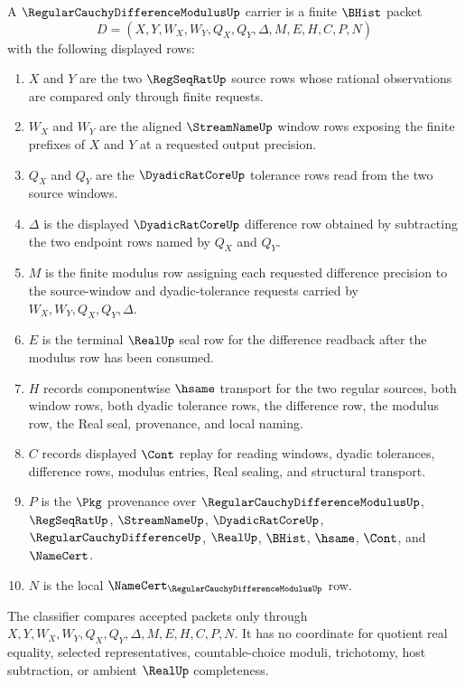 \begin{definition}
\label{def:regular-cauchy-difference-modulus-carrier}
A $\RegularCauchyDifferenceModulusUp$ carrier is a finite $\BHist$ packet
$$
D=(X,Y,W_X,W_Y,Q_X,Q_Y,\Delta,M,E,H,C,P,N)
$$
with the following displayed rows:
\begin{enumerate}
\item $X$ and $Y$ are the two $\RegSeqRatUp$ source rows whose rational observations are compared only through finite requests.
\item $W_X$ and $W_Y$ are the aligned $\StreamNameUp$ window rows exposing the finite prefixes of $X$ and $Y$ at a requested output precision.
\item $Q_X$ and $Q_Y$ are the $\DyadicRatCoreUp$ tolerance rows read from the two source windows.
\item $\Delta$ is the displayed $\DyadicRatCoreUp$ difference row obtained by subtracting the two endpoint rows named by $Q_X$ and $Q_Y$.
\item $M$ is the finite modulus row assigning each requested difference precision to the source-window and dyadic-tolerance requests carried by $W_X,W_Y,Q_X,Q_Y,\Delta$.
\item $E$ is the terminal $\RealUp$ seal row for the difference readback after the modulus row has been consumed.
\item $H$ records componentwise $\hsame$ transport for the two regular sources, both window rows, both dyadic tolerance rows, the difference row, the modulus row, the Real seal, provenance, and local naming.
\item $C$ records displayed $\Cont$ replay for reading windows, dyadic tolerances, difference rows, modulus entries, Real sealing, and structural transport.
\item $P$ is the $\Pkg$ provenance over $\RegularCauchyDifferenceModulusUp$, $\RegSeqRatUp$, $\StreamNameUp$, $\DyadicRatCoreUp$, $\RegularCauchyDifferenceUp$, $\RealUp$, $\BHist$, $\hsame$, $\Cont$, and $\NameCert$.
\item $N$ is the local $\NameCert_{\RegularCauchyDifferenceModulusUp}$ row.
\end{enumerate}
The classifier compares accepted packets only through $X,Y,W_X,W_Y,Q_X,Q_Y,\Delta,M,E,H,C,P,N$. It has no coordinate for quotient real equality, selected representatives, countable-choice moduli, trichotomy, host subtraction, or ambient $\RealUp$ completeness.
\end{definition}

